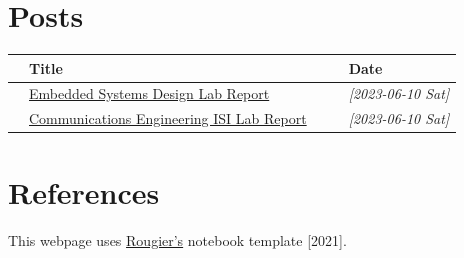 \documentclass[11pt]{article}
\begin{document}
\section*{Posts}
\label{sec:org78c45f4}
\begin{center}
\begin{tabular}{lllll}
 & Title &  &  & Date\\[0pt]
\hline
 & \href{Posts/EmbeddedReport.pdf}{Embedded Systems Design Lab Report} &  &  & \textit{[2023-06-10 Sat]}\\[0pt]
 & \href{Posts/MaxwellMorris\_ISI\_Lab.pdf}{Communications Engineering ISI Lab Report} &  &  & \textit{[2023-06-10 Sat]}\\[0pt]
\end{tabular}
\end{center}


\section*{References}
\label{sec:org4c0cdf5}
This webpage uses \href{https://github.com/rougier/notebook-mode}{Rougier's} notebook template [2021].
\end{document}
